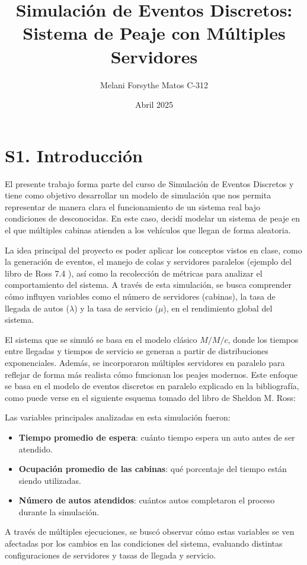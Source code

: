 \documentclass[12pt]{article}
\title{Simulación de Eventos Discretos: Sistema de Peaje con Múltiples Servidores}
\author{Melani Forsythe Matos C-312}
\date{Abril 2025}
\begin{document}
\maketitle

\section*{S1. Introducción}

El presente trabajo forma parte del curso de Simulación de Eventos Discretos y tiene como objetivo desarrollar un modelo de simulación que nos permita representar de manera clara  el funcionamiento de un sistema real bajo condiciones de desconocidas. En este caso, decidí modelar un sistema de peaje en el que múltiples cabinas atienden a los vehículos que llegan de forma aleatoria.

La idea principal del proyecto es poder aplicar los conceptos vistos en clase, como la generación de eventos, el manejo de colas y servidores paralelos (ejemplo del libro de Ross 7.4 ), así como la recolección de métricas para analizar el comportamiento del sistema. A través de esta simulación, se busca comprender cómo influyen variables como el número de servidores (cabinas), la tasa de llegada de autos ($\lambda$) y la tasa de servicio ($\mu$), en el rendimiento global del sistema.

El sistema que se simuló se basa en el modelo clásico $M/M/c$, donde los tiempos entre llegadas y tiempos de servicio se generan a partir de distribuciones exponenciales. Además, se incorporaron múltiples servidores en paralelo para reflejar de forma más realista cómo funcionan los peajes modernos. Este enfoque se basa en el modelo de eventos discretos en paralelo explicado en la bibliografía, como puede verse en el siguiente esquema tomado del libro de Sheldon M. Ross:

Las variables principales analizadas en esta simulación fueron:
\begin{itemize}
  \item \textbf{Tiempo promedio de espera}: cuánto tiempo espera un auto antes de ser atendido.
  \item \textbf{Ocupación promedio de las cabinas}: qué porcentaje del tiempo están siendo utilizadas.
  \item \textbf{Número de autos atendidos}: cuántos autos completaron el proceso durante la simulación.
\end{itemize}

A través de múltiples ejecuciones, se buscó observar cómo estas variables se ven afectadas por los cambios en las condiciones del sistema, evaluando distintas configuraciones de servidores y tasas de llegada y servicio.
\end{document}
